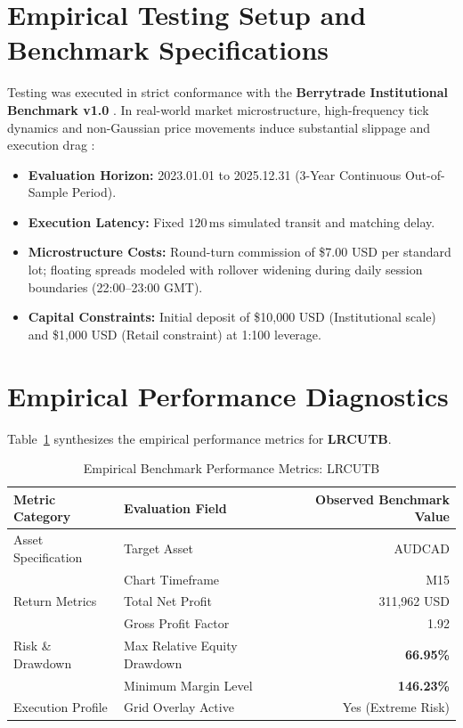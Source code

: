 \documentclass[11pt,a4paper]{article}
\begin{document}
\section{Empirical Testing Setup and Benchmark Specifications}
Testing was executed in strict conformance with the \textbf{Berrytrade Institutional Benchmark v1.0} \cite{artsu2026illusion}. In real-world market microstructure, high-frequency tick dynamics and non-Gaussian price movements induce substantial slippage and execution drag \cite{kyle1985continuous, amihud2002illiquidity, cont2001empirical, mandelbrot1963variation}:
\begin{itemize}
    \item \textbf{Evaluation Horizon:} 2023.01.01 to 2025.12.31 (3-Year Continuous Out-of-Sample Period).
    \item \textbf{Execution Latency:} Fixed $120\,\text{ms}$ simulated transit and matching delay.
    \item \textbf{Microstructure Costs:} Round-turn commission of \$7.00 USD per standard lot; floating spreads modeled with rollover widening during daily session boundaries (22:00--23:00 GMT).
    \item \textbf{Capital Constraints:} Initial deposit of \$10,000 USD (Institutional scale) and \$1,000 USD (Retail constraint) at 1:100 leverage.
\end{itemize}

\section{Empirical Performance Diagnostics}
Table~\ref{tab:metrics} synthesizes the empirical performance metrics for \textbf{LRCUTB}.

\begin{table}[H]
\centering
\caption{Empirical Benchmark Performance Metrics: LRCUTB}
\label{tab:metrics}
\begin{tabular}{llr}
\toprule
\textbf{Metric Category} & \textbf{Evaluation Field} & \textbf{Observed Benchmark Value} \\
\midrule
Asset Specification & Target Asset & AUDCAD \\
& Chart Timeframe & M15 \\
Return Metrics & Total Net Profit & 311,962 USD \\
& Gross Profit Factor & 1.92 \\
Risk \& Drawdown & Max Relative Equity Drawdown & \textbf{66.95\%} \\
& Minimum Margin Level & \textbf{146.23\%} \\
Execution Profile & Grid Overlay Active & Yes (Extreme Risk) \\
\bottomrule
\end{tabular}
\end{table}
\end{document}
